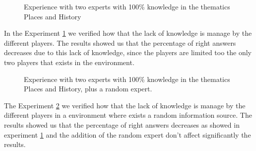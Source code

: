 \documentclass{llncs}
\begin{document}
\begin{figure}
\centering
{}
\caption{Experience with two experts with 100\% knowledge in the thematics Places and History}
\label{twoexperts}
\end{figure}

In the Experiment \ref{twoexperts} we verified how that the lack of knowledge is manage by the different players. The results showed us that the percentage of right answers decreases due to this lack of knowledge, since the players are limited too the only two players that exists in the environment.

\begin{figure}
\centering
{}
\caption{Experience with two experts with 100\% knowledge in the thematics Places and History, plus a random expert.}
\label{twoexpertsrandom}
\end{figure}

The Experiment \ref{twoexpertsrandom} we verified how that the lack of knowledge is manage by the different players in a environment where exists a random information source. The results showed us that the percentage of right answers decreases as showed in experiment \ref{twoexperts} and the addition of the random expert don't affect significantly the results.
\end{document}
